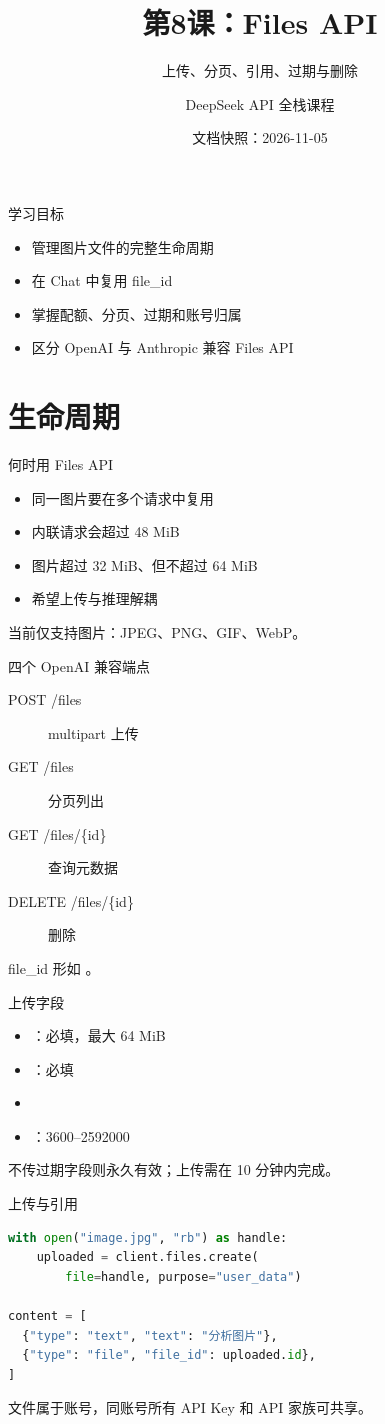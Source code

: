 \documentclass[aspectratio=169,UTF8]{ctexbeamer}
\title{第8课：Files API}
\subtitle{上传、分页、引用、过期与删除}
\author{DeepSeek API 全栈课程}
\date{文档快照：2026-11-05}
\begin{document}
\frame{\titlepage}
\begin{frame}{学习目标}
\begin{itemize}
  \item 管理图片文件的完整生命周期
  \item 在 Chat 中复用 file\_id
  \item 掌握配额、分页、过期和账号归属
  \item 区分 OpenAI 与 Anthropic 兼容 Files API
\end{itemize}
\end{frame}
\section{生命周期}
\begin{frame}{何时用 Files API}
\begin{itemize}
  \item 同一图片要在多个请求中复用
  \item 内联请求会超过 48 MiB
  \item 图片超过 32 MiB、但不超过 64 MiB
  \item 希望上传与推理解耦
\end{itemize}
当前仅支持图片：JPEG、PNG、GIF、WebP。
\end{frame}
\begin{frame}{四个 OpenAI 兼容端点}
\begin{description}
  \item[POST /files] multipart 上传
  \item[GET /files] 分页列出
  \item[GET /files/\{id\}] 查询元数据
  \item[DELETE /files/\{id\}] 删除
\end{description}
file\_id 形如 。
\end{frame}
\begin{frame}{上传字段}
\begin{itemize}
  \item {}：必填，最大 64 MiB
  \item {}：必填
  \item {}
  \item {}：3600--2592000
\end{itemize}
不传过期字段则永久有效；上传需在 10 分钟内完成。
\end{frame}
\begin{frame}[fragile]{上传与引用}
\begin{lstlisting}[language=Python]
with open("image.jpg", "rb") as handle:
    uploaded = client.files.create(
        file=handle, purpose="user_data")

content = [
  {"type": "text", "text": "分析图片"},
  {"type": "file", "file_id": uploaded.id},
]
\end{lstlisting}
文件属于账号，同账号所有 API Key 和 API 家族可共享。
\end{frame}
\end{document}
